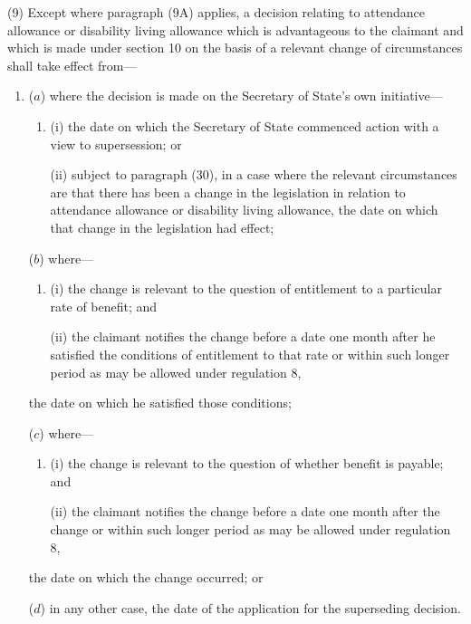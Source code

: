 \documentclass[12pt,a4paper]{article}
\begin{document}
(9) 
Except where paragraph (9A) applies,  %
a decision relating to attendance allowance or disability living allowance which is advantageous to the claimant and which is made under section 10 on the basis of a relevant change of circumstances shall take effect from—
\begin{enumerate}\item[]

($a$) where the decision is made on the Secretary of State’s own initiative—
\begin{enumerate}\item[]
(i) the date on which the Secretary of State commenced action with a view to supersession; or

(ii) subject to paragraph (30), in a case where the relevant circumstances are that there has been a change in the legislation in relation to attendance allowance or disability living allowance, the date on which that change in the legislation had effect;
\end{enumerate}

($b$) where—
\begin{enumerate}\item[]
(i) the change is relevant to the question of entitlement to a particular rate of benefit; and

(ii) the claimant notifies the change before a date one month after he satisfied the conditions of entitlement to that rate or within such longer period as may be allowed under regulation 8,
\end{enumerate}
the 
date on which  %
he satisfied those conditions;

($c$) where—
\begin{enumerate}\item[]
(i) the change is relevant to the question of whether benefit is payable; and

(ii) the claimant notifies the change before a date one month after the change or within such longer period as may be allowed under regulation 8,
\end{enumerate}
the 
date on which  %
the change occurred; or

($d$) in any other case, the date of the application for the superseding decision.
\end{enumerate}
\end{document}
